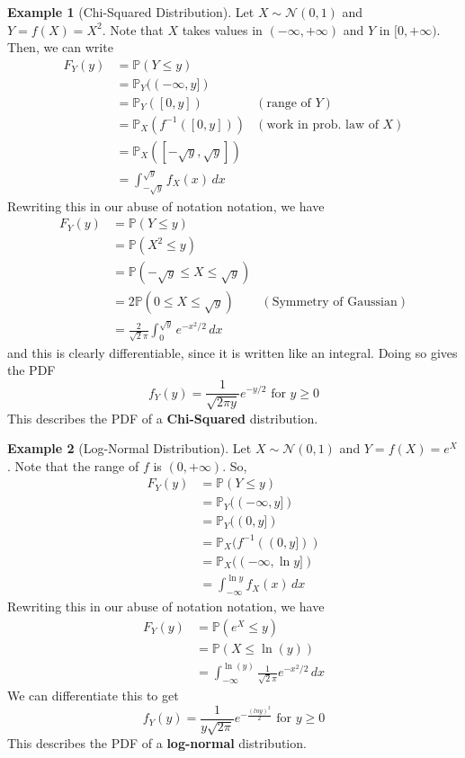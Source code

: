 \documentclass{article}
\theoremstyle{definition}
\newtheorem{example}{Example}[section]
\theoremstyle{remark}
\theoremstyle{definition}
\begin{document}
\begin{example}[Chi-Squared Distribution]
Let $X \sim \mathcal{N}(0, 1)$ and $Y = f(X) = X^2$. Note that $X$ takes values in $(-\infty, +\infty)$ and $Y$ in $[0, +\infty)$. Then, we can write 
\begin{align*}
    F_Y (y) & = \mathbb{P}(Y \leq y) \\ 
    & = \mathbb{P}_Y ( (-\infty, y]) \\
    & = \mathbb{P}_Y (  [0, y]) & (\text{range of } Y) \\
    & = \mathbb{P}_X ( f^{-1} ([0, y]) ) & (\text{work in prob. law of } X) \\
    & = \mathbb{P}_X ( [-\sqrt{y}, \sqrt{y}] ) \\
    & = \int_{-\sqrt{y}}^{\sqrt{y}} f_X (x) \,dx 
\end{align*}
Rewriting this in our abuse of notation notation, we have 
\begin{align*}
    F_Y (y) & = \mathbb{P}(Y \leq y) \\
    & = \mathbb{P}(X^2 \leq y) \\
    & = \mathbb{P}( -\sqrt{y} \leq X \leq \sqrt{y}) \\
    & = 2 \mathbb{P}(0 \leq X \leq \sqrt{y}) & (\text{Symmetry of Gaussian})\\
    & = \frac{2}{\sqrt{2} \pi} \int_0^{\sqrt{y}} e^{-x^2 / 2} \,dx 
\end{align*}
and this is clearly differentiable, since it is written like an integral. Doing so gives the PDF
\[f_Y (y) = \frac{1}{\sqrt{2 \pi y}} e^{-y/2} \text{ for } y \geq 0\]
This describes the PDF of a \textbf{Chi-Squared} distribution. 
\end{example}

\begin{example}[Log-Normal Distribution]
Let $X \sim \mathcal{N}(0, 1)$ and $Y = f(X) = e^X$. Note that the range of $f$ is $(0, +\infty)$. So, 
\begin{align*}
    F_Y (y) & = \mathbb{P}(Y \leq y) \\
    & = \mathbb{P}_Y ((-\infty, y]) \\
    & = \mathbb{P}_Y ( (0, y]) \\ 
    & = \mathbb{P}_X ( f^{-1} ((0, y]) ) \\
    & = \mathbb{P}_X ( (-\infty, \ln{y}] ) \\
    & = \int_{-\infty}^{\ln{y}} f_X (x)\,dx 
\end{align*}
Rewriting this in our abuse of notation notation, we have 
\begin{align*}
    F_Y (y) & = \mathbb{P}(e^X \leq y) \\
    & = \mathbb{P}(X \leq \ln(y)) \\ 
    & = \int_{-\infty}^{\ln(y)} \frac{1}{\sqrt{2} \pi} e^{-x^2/ 2} \,dx 
\end{align*}
We can differentiate this to get 
\[f_Y (y) = \frac{1}{y \sqrt{2 \pi}} e^{-\frac{(ln{y})^2}{2}} \text{ for } y \geq 0\]
This describes the PDF of a \textbf{log-normal} distribution. 
\end{example}
\end{document}
